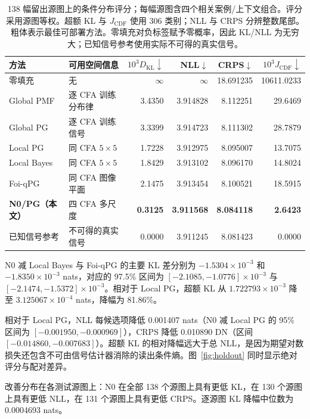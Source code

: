 \documentclass[10pt,twocolumn,journal]{IEEEtran}
\begin{document}
\begin{table}[t]
\centering\small
\caption{138 幅留出源图上的条件分布评分；每幅源图含四个相关案例/上下文组合。评分采用源图等权。超额 KL 与 $J_{\mathrm{CDF}}$ 使用 306 类别；NLL 与 CRPS 分辨整数尾部。粗体表示最佳可部署方法。零填充对负标签赋予零概率，因此 KL/NLL 为无穷大；已知信号参考使用实际不可得的真实信号。}
\label{tab:holdout}
\begin{tabular}{@{}llrrrr@{}}
\toprule
方法 & 可用空间信息 & $10^3D_{\mathrm{KL}}\downarrow$ & NLL$\downarrow$ & CRPS$\downarrow$ & $10^3J_{\mathrm{CDF}}\downarrow$\\
\midrule
零填充 & 无 & $\infty$ & $\infty$ & 18.691235 & 10611.0233\\
Global PMF & 逐 CFA 训练分布律 & 3.4350 & 3.914828 & 8.112251 & 29.6469\\
Global PG & 逐 CFA 训练信号 & 3.3399 & 3.914723 & 8.111302 & 28.7879\\
Local PG & 同 CFA $5\times5$ & 1.7228 & 3.912975 & 8.095007 & 13.7075\\
Local Bayes & 同 CFA $5\times5$ & 1.8429 & 3.913102 & 8.096170 & 14.8024\\
Foi-qPG & 同 CFA 图像平面 & 2.1475 & 3.913454 & 8.100521 & 18.5915\\
\textbf{N0/PG（本文）} & 四 CFA 多尺度 & \textbf{0.3125} & \textbf{3.911568} & \textbf{8.084118} & \textbf{2.6423}\\
已知信号参考 & 不可得的真实信号 & 0.0000 & 3.911245 & 8.081423 & 0.0000\\
\bottomrule
\end{tabular}
\end{table}

N0 减 Local Bayes 与 Foi-qPG 的主要 KL 差分别为 $-1.5304\times10^{-3}$ 和 $-1.8350\times10^{-3}$ nats，对应的 97.5\% 区间为 $[-2.1085,-1.0776]\times10^{-3}$ 与 $[-2.1474,-1.5372]\times10^{-3}$。相对于 Local PG，超额 KL 从 $1.722793\times10^{-3}$ 降至 $3.125067\times10^{-4}$ nats，降幅为 81.86\%。



相对于 Local PG，NLL 每候选项降低 0.001407 nats（N0 减 Local PG 的 95\% 区间为 $[-0.001950,-0.000969]$），CRPS 降低 0.010890 DN（区间 $[-0.014860,-0.007683]$）。超额 KL 的相对降幅远大于总 NLL，是因为期望对数损失还包含不可由信号估计器消除的读出条件熵。图~\ref{fig:holdout} 同时显示绝对评分与配对差异。

改善分布在各测试源图上：N0 在全部 138 个源图上具有更低 KL，在 130 个源图上具有更低 NLL，在 131 个源图上具有更低 CRPS。逐源图 KL 降幅中位数为 0.0004693 nats。
\end{document}
